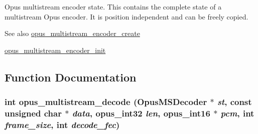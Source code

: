 Opus multistream encoder state. This contains the complete state of a multistream Opus encoder. It is position independent and can be freely copied. \begin{DoxySeeAlso}{See also}
\hyperlink{group__opus__multistream_gaeb64c648ed8155f824ca8d9a93ccecae}{opus\_\-multistream\_\-encoder\_\-create} 

\hyperlink{group__opus__multistream_gae7586aa54c322fd9599de24b5c8b8c01}{opus\_\-multistream\_\-encoder\_\-init} 
\end{DoxySeeAlso}


\subsection{Function Documentation}
\hypertarget{group__opus__multistream_gaa4b89541efe01970cf52e4a336db3ad0}{
\subsubsection[{opus\_\-multistream\_\-decode}]{\setlength{\rightskip}{0pt plus 5cm}int opus\_\-multistream\_\-decode ({\bf OpusMSDecoder} $\ast$ {\em st}, \/  const unsigned char $\ast$ {\em data}, \/  {\bf opus\_\-int32} {\em len}, \/  {\bf opus\_\-int16} $\ast$ {\em pcm}, \/  int {\em frame\_\-size}, \/  int {\em decode\_\-fec})}}
\label{group__opus__multistream_gaa4b89541efe01970cf52e4a336db3ad0}


